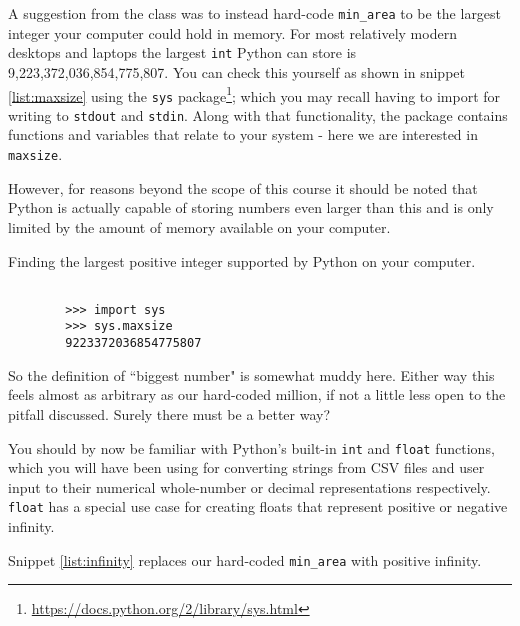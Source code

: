 \documentclass[a4paper]{article}
\begin{document}
A suggestion from the class was to instead hard-code \texttt{min\_area} to be the
largest integer your computer could hold in memory. For most relatively modern desktops
and laptops the largest \texttt{int} Python can store is 9,223,372,036,854,775,807.
You can check this yourself as shown in snippet \ref{list:maxsize} using the \texttt{sys} package\footnote{{\href{https://docs.python.org/2/library/sys.html}{https://docs.python.org/2/library/sys.html}}};
which you may recall having to import for writing to \texttt{stdout} and \texttt{stdin}.
Along with that functionality, the package contains functions and variables that
relate to your system - here we are interested in \texttt{maxsize}.

However, for reasons beyond the scope of this course it should be noted that
Python is actually capable of storing numbers even larger than this and is only limited
by the amount of memory available on your computer.

\begin{listing}[H]
    \caption[]{Finding the largest positive integer supported by Python on your computer.}
    \label{list:maxsize}
    \begin{verbatim}

        >>> import sys
        >>> sys.maxsize
        9223372036854775807
    \end{verbatim}
\end{listing}

So the definition of ``biggest number" is somewhat muddy here. Either way this feels
almost as arbitrary as our hard-coded million, if not a little less open to the
pitfall discussed. Surely there must be a better way?

You should by now be familiar with Python's built-in \texttt{int} and \texttt{float}
functions, which you will
have been using for converting strings from CSV files and user input to their
numerical whole-number or decimal representations respectively. \texttt{float}
has a special use case for creating floats that represent positive or negative infinity.

Snippet \ref{list:infinity} replaces our hard-coded \texttt{min\_area} with positive infinity.
\end{document}
